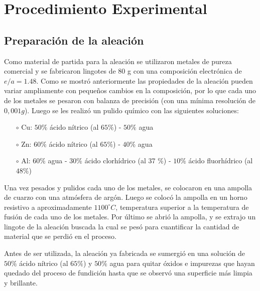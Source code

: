 \documentclass[a4paper,12pt,fleqn,twoside,openany]{book}
\begin{document}

\chapter{Procedimiento Experimental}



\section{Preparación de la aleación} \label{preparacion_aleacion}


Como material de partida para la aleación se utilizaron metales de pureza comercial y se fabricaron lingotes de 80 g con una composición electrónica de 
$e/a=1.48$. Como se mostró anteriormente las propiedades de la aleación pueden variar ampliamente 
con pequeños cambios en la composición, por lo que cada uno de los metales se pesaron con balanza de precisión (con una mínima resolución de $0,001g$). 
Luego se les realizó un pulido químico con las siguientes soluciones:
\begin{itemize}
 \item[$\circ$] Cu: $50 \%$ ácido nítrico (al $65 \%$) - $50 \%$ agua
 \item[$\circ$] Zn: $60 \%$ ácido nítrico (al $65 \%$) - $40 \%$ agua
 \item[$\circ$] Al: $60 \%$ agua - $30 \%$ ácido clorhídrico (al 37 \%) - $10 \%$ ácido fluorhídrico (al $48 \%$)
\end{itemize}

Una vez pesados y pulidos cada uno de los metales, se colocaron en una ampolla de cuarzo con una atmósfera de argón. Luego se colocó la ampolla en 
un horno resistivo a aproximadamente $1100^\circ C$, temperatura superior a la temperatura de fusión de cada uno de los metales. Por último se abrió la ampolla, y se extrajo un 
lingote de la aleación buscada la cual se pesó para cuantificar la cantidad de material que se perdió en el proceso.  

Antes de ser utilizada, la aleación ya fabricada se sumergió en una solución de $50 \%$ ácido nítrico (al $65 \%$) y 
$50 \%$ agua para quitar óxidos e impurezas que hayan quedado del proceso de fundición hasta que se observó una superficie más limpia y brillante.
\end{document}
